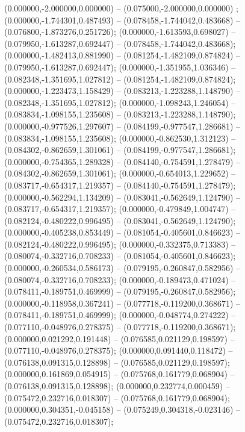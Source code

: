  (0.000000,-2.000000,0.000000) -- (0.075000,-2.000000,0.000000) ;
 (0.000000,-1.744301,0.487493) -- (0.078458,-1.744042,0.483668) -- (0.076800,-1.873276,0.251726);
 (0.000000,-1.613593,0.698027) -- (0.079950,-1.613287,0.692447) -- (0.078458,-1.744042,0.483668);
 (0.000000,-1.482413,0.881990) -- (0.081254,-1.482109,0.874824) -- (0.079950,-1.613287,0.692447);
 (0.000000,-1.351955,1.036346) -- (0.082348,-1.351695,1.027812) -- (0.081254,-1.482109,0.874824);
 (0.000000,-1.223473,1.158429) -- (0.083213,-1.223288,1.148790) -- (0.082348,-1.351695,1.027812);
 (0.000000,-1.098243,1.246054) -- (0.083834,-1.098155,1.235608) -- (0.083213,-1.223288,1.148790);
 (0.000000,-0.977526,1.297607) -- (0.084199,-0.977547,1.286681) -- (0.083834,-1.098155,1.235608);
 (0.000000,-0.862530,1.312123) -- (0.084302,-0.862659,1.301061) -- (0.084199,-0.977547,1.286681);
 (0.000000,-0.754365,1.289328) -- (0.084140,-0.754591,1.278479) -- (0.084302,-0.862659,1.301061);
 (0.000000,-0.654013,1.229652) -- (0.083717,-0.654317,1.219357) -- (0.084140,-0.754591,1.278479);
 (0.000000,-0.562294,1.134209) -- (0.083041,-0.562649,1.124790) -- (0.083717,-0.654317,1.219357);
 (0.000000,-0.479849,1.004747) -- (0.082124,-0.480222,0.996495) -- (0.083041,-0.562649,1.124790);
 (0.000000,-0.405238,0.853449) -- (0.081054,-0.405601,0.846623) -- (0.082124,-0.480222,0.996495);
 (0.000000,-0.332375,0.713383) -- (0.080074,-0.332716,0.708233) -- (0.081054,-0.405601,0.846623);
 (0.000000,-0.260534,0.586173) -- (0.079195,-0.260847,0.582956) -- (0.080074,-0.332716,0.708233);
 (0.000000,-0.189473,0.471024) -- (0.078411,-0.189751,0.469999) -- (0.079195,-0.260847,0.582956);
 (0.000000,-0.118958,0.367241) -- (0.077718,-0.119200,0.368671) -- (0.078411,-0.189751,0.469999);
 (0.000000,-0.048774,0.274222) -- (0.077110,-0.048976,0.278375) -- (0.077718,-0.119200,0.368671);
 (0.000000,0.021292,0.191448) -- (0.076585,0.021129,0.198597) -- (0.077110,-0.048976,0.278375);
 (0.000000,0.091440,0.118472) -- (0.076138,0.091315,0.128898) -- (0.076585,0.021129,0.198597);
 (0.000000,0.161869,0.054915) -- (0.075768,0.161779,0.068904) -- (0.076138,0.091315,0.128898);
 (0.000000,0.232774,0.000459) -- (0.075472,0.232716,0.018307) -- (0.075768,0.161779,0.068904);
 (0.000000,0.304351,-0.045158) -- (0.075249,0.304318,-0.023146) -- (0.075472,0.232716,0.018307);
